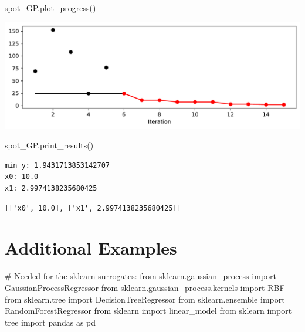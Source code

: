 \documentclass[
  letterpaper,
  DIV=11,
  numbers=noendperiod]{scrreprt}
\newenvironment{Shaded}{\begin{snugshade}}{\end{snugshade}}
\newcommand{\CommentTok}[1]{\textcolor[rgb]{0.37,0.37,0.37}{#1}}
\newcommand{\ImportTok}[1]{\textcolor[rgb]{0.00,0.46,0.62}{#1}}
\newcommand{\NormalTok}[1]{\textcolor[rgb]{0.00,0.23,0.31}{#1}}
\begin{document}
\begin{Shaded}
\begin{Highlighting}[]
\NormalTok{spot\_GP.plot\_progress()}
\end{Highlighting}
\end{Shaded}

\includegraphics{012_num_spot_ei_files/figure-pdf/cell-34-output-1.pdf}

\begin{Shaded}
\begin{Highlighting}[]
\NormalTok{spot\_GP.print\_results()}
\end{Highlighting}
\end{Shaded}

\begin{verbatim}
min y: 1.9431713853142707
x0: 10.0
x1: 2.9974138235680425
\end{verbatim}

\begin{verbatim}
[['x0', 10.0], ['x1', 2.9974138235680425]]
\end{verbatim}

\section{Additional Examples}\label{additional-examples}

\begin{Shaded}
\begin{Highlighting}[]
\CommentTok{\# Needed for the sklearn surrogates:}
\ImportTok{from}\NormalTok{ sklearn.gaussian\_process }\ImportTok{import}\NormalTok{ GaussianProcessRegressor}
\ImportTok{from}\NormalTok{ sklearn.gaussian\_process.kernels }\ImportTok{import}\NormalTok{ RBF}
\ImportTok{from}\NormalTok{ sklearn.tree }\ImportTok{import}\NormalTok{ DecisionTreeRegressor}
\ImportTok{from}\NormalTok{ sklearn.ensemble }\ImportTok{import}\NormalTok{ RandomForestRegressor}
\ImportTok{from}\NormalTok{ sklearn }\ImportTok{import}\NormalTok{ linear\_model}
\ImportTok{from}\NormalTok{ sklearn }\ImportTok{import}\NormalTok{ tree}
\ImportTok{import}\NormalTok{ pandas }\ImportTok{as}\NormalTok{ pd}
\end{Highlighting}
\end{Shaded}
\end{document}
